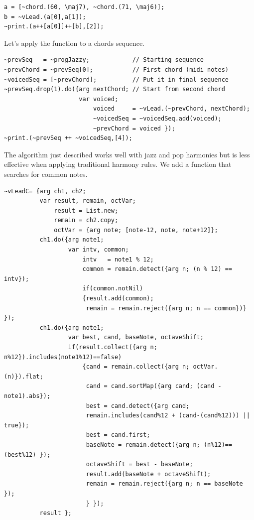 \begin{lstlisting}[frame=single] 
a = [~chord.(60, \maj7), ~chord.(71, \maj6)];
b = ~vLead.(a[0],a[1]);
~print.(a++[a[0]]++[b],[2]);
\end{lstlisting}

Let's apply the function to a chords sequence.

\begin{lstlisting}[frame=single] 
~prevSeq   = ~progJazzy;            // Starting sequence
~prevChord = ~prevSeq[0];           // First chord (midi notes)
~voicedSeq = [~prevChord];          // Put it in final sequence
~prevSeq.drop(1).do({arg nextChord; // Start from second chord
                     var voiced;                           
                         voiced     = ~vLead.(~prevChord, nextChord); 
                         ~voicedSeq = ~voicedSeq.add(voiced); 
                         ~prevChord = voiced });
~print.(~prevSeq ++ ~voicedSeq,[4]);
\end{lstlisting}

The algorithm just described works well with jazz and pop harmonies but is less effective when applying traditional harmony rules. We add a function that searches for common notes.

\begin{lstlisting}[frame=single, caption=voice-leading common notes model function] 
~vLeadC= {arg ch1, ch2;
          var result, remain, octVar;
              result = List.new;
              remain = ch2.copy;
              octVar = {arg note; [note-12, note, note+12]};
          ch1.do({arg note1; 
                  var intv, common;
                      intv   = note1 % 12;
                      common = remain.detect({arg n; (n % 12) == intv});
                      if(common.notNil)
                      {result.add(common);
                       remain = remain.reject({arg n; n == common})} });
          ch1.do({arg note1; 
                  var best, cand, baseNote, octaveShift;
                  if(result.collect({arg n; n%12}).includes(note1%12)==false) 
                      {cand = remain.collect({arg n; octVar.(n)}).flat;
                       cand = cand.sortMap({arg cand; (cand - note1).abs});
                       best = cand.detect({arg cand;
                       remain.includes(cand%12 + (cand-(cand%12))) || true});
                       best = cand.first;
                       baseNote = remain.detect({arg n; (n%12)==(best%12) });
                       octaveShift = best - baseNote;
                       result.add(baseNote + octaveShift);
                       remain = remain.reject({arg n; n == baseNote });
                       } });
          result };
\end{lstlisting}

